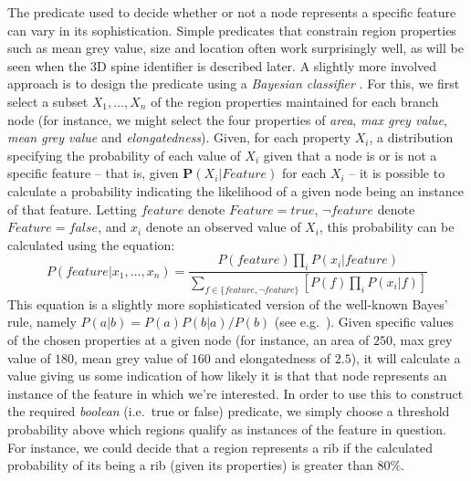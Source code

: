The predicate used to decide whether or not a node represents a specific feature can vary in its sophistication. Simple predicates that constrain region properties such as mean grey value, size and location often work surprisingly well, as will be seen when the 3D spine identifier is described later. A slightly more involved approach is to design the predicate using a \emph{Bayesian classifier} . For this, we first select a subset $X_1,\ldots,X_n$ of the region properties maintained for each branch node (for instance, we might select the four properties of \emph{area}, \emph{max grey value}, \emph{mean grey value} and \emph{elongatedness}). Given, for each property $X_i$, a distribution specifying the probability of each value of $X_i$ given that a node is or is not a specific feature -- that is, given $\mathbf{P}(X_i | \textit{Feature})$ for each $X_i$ -- it is possible to calculate a probability indicating the likelihood of a given node being an instance of that feature. Letting $\mathit{feature}$ denote $\mathit{Feature} = \mathit{true}$, $\neg \mathit{feature}$ denote $\mathit{Feature} = \mathit{false}$, and $x_i$ denote an observed value of $X_i$, this probability can be calculated using the equation:
%
\[
P(\mathit{feature}|x_1,\ldots,x_n) = \frac{P(\mathit{feature}) \displaystyle \prod_i P(x_i|\mathit{feature})}{\displaystyle \sum_{f \in \{\mathit{feature},\neg \mathit{feature}\}} \left[ P(f) \displaystyle \prod_i P(x_i|f) \right]}
\]
%
This equation is a slightly more sophisticated version of the well-known Bayes' rule, namely $P(a|b) = P(a) P(b|a) / P(b)$ (see e.g.~\cite{aima}). Given specific values of the chosen properties at a given node (for instance, an area of $250$, max grey value of $180$, mean grey value of $160$ and elongatedness of $2.5$), it will calculate a value giving us some indication of how likely it is that that node represents an instance of the feature in which we're interested. In order to use this to construct the required \emph{boolean} (i.e.~true or false) predicate, we simply choose a threshold probability above which regions qualify as instances of the feature in question. For instance, we could decide that a region represents a rib if the calculated probability of its being a rib (given its properties) is greater than $80\%$.

